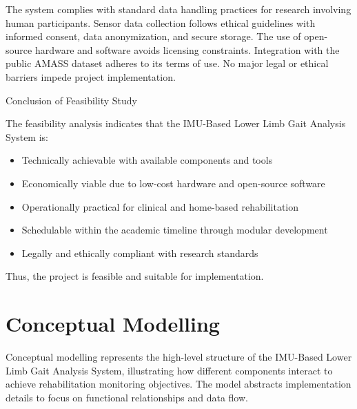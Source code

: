 \documentclass[12pt,a4paper]{report}
\begin{document}
The system complies with standard data handling practices for research involving human participants. Sensor data collection follows ethical guidelines with informed consent, data anonymization, and secure storage. The use of open-source hardware and software avoids licensing constraints. Integration with the public AMASS dataset adheres to its terms of use. No major legal or ethical barriers impede project implementation.

Conclusion of Feasibility Study

The feasibility analysis indicates that the IMU-Based Lower Limb Gait Analysis System is:
\begin{itemize}
\item Technically achievable with available components and tools

\item Economically viable due to low-cost hardware and open-source software

\item Operationally practical for clinical and home-based rehabilitation

\item Schedulable within the academic timeline through modular development

\item Legally and ethically compliant with research standards
\end{itemize}
Thus, the project is feasible and suitable for implementation.

\section{Conceptual Modelling}
Conceptual modelling represents the high-level structure of the IMU-Based Lower Limb Gait Analysis System, illustrating how different components interact to achieve rehabilitation monitoring objectives. The model abstracts implementation details to focus on functional relationships and data flow.
\end{document}

